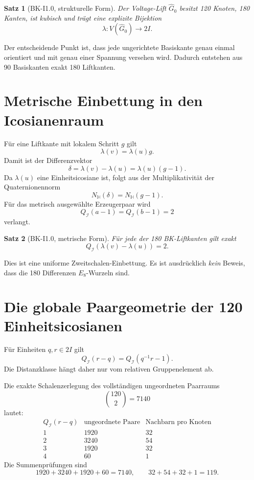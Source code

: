 \documentclass[11pt,a4paper]{article}
\newtheorem{theorem}{Satz}[section]
\theoremstyle{definition}
\theoremstyle{remark}
\newcommand{\QI}{Q_{\mathcal I}}
\newcommand{\HH}{\mathbb H}
\begin{document}
\begin{theorem}[BK-I1.0, strukturelle Form]
Der Voltage-Lift $\widehat G_0$ besitzt 120 Knoten, 180 Kanten, ist kubisch und trägt eine explizite Bijektion
\[
\lambda:V(\widehat G_0)\to2I.
\]
\end{theorem}

Der entscheidende Punkt ist, dass jede ungerichtete Basiskante genau einmal orientiert und mit genau einer Spannung versehen wird. Dadurch entstehen aus 90 Basiskanten exakt 180 Liftkanten.

\section{Metrische Einbettung in den Icosianenraum}
Für eine Liftkante mit lokalem Schritt $g$ gilt
\[
\lambda(v)=\lambda(u)g.
\]
Damit ist der Differenzvektor
\[
\delta=\lambda(v)-\lambda(u)=\lambda(u)(g-1).
\]
Da $\lambda(u)$ eine Einheitsicosiane ist, folgt aus der Multiplikativität der Quaternionennorm
\[
N_{\HH}(\delta)=N_{\HH}(g-1).
\]
Für das metrisch ausgewählte Erzeugerpaar wird
\[
\QI(a-1)=\QI(b-1)=2
\]
verlangt.

\begin{theorem}[BK-I1.0, metrische Form]
Für jede der 180 BK-Liftkanten gilt exakt
\[
\boxed{\QI(\lambda(v)-\lambda(u))=2.}
\]
\end{theorem}

Dies ist eine uniforme Zweitschalen-Einbettung. Es ist ausdrücklich \emph{kein} Beweis, dass die 180 Differenzen $E_8$-Wurzeln sind.

\section{Die globale Paargeometrie der 120 Einheitsicosianen}
Für Einheiten $q,r\in2I$ gilt
\[
\QI(r-q)=\QI(q^{-1}r-1).
\]
Die Distanzklasse hängt daher nur vom relativen Gruppenelement ab.

Die exakte Schalenzerlegung des vollständigen ungeordneten Paarraums
\[
\binom{120}{2}=7140
\]
lautet:
\[
\begin{array}{c|r|r}
\QI(r-q)&\text{ungeordnete Paare}&\text{Nachbarn pro Knoten}\\
\hline
1&1920&32\\
2&3240&54\\
3&1920&32\\
4&60&1
\end{array}
\]
Die Summenprüfungen sind
\[
1920+3240+1920+60=7140,
\qquad
32+54+32+1=119.
\]
\end{document}
